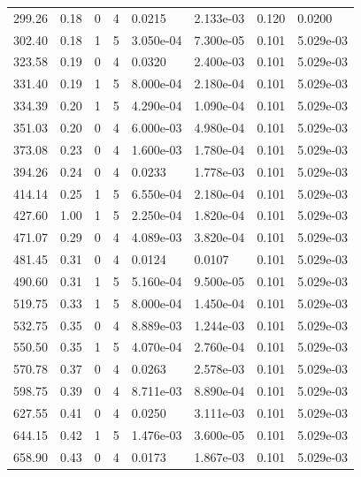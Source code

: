 \documentclass[preview]{standalone}
\begin{document}
{{\begin{tabular}{L{1.2cm}C{1.2cm} C{0.3cm}C{0.5cm} C{1.4cm}C{1.4cm} C{1.4cm}C{1.4cm}}
  299.26  &  0.18  & 0     &  4 &  0.0215  & 2.133e-03  & 0.120 &  0.0200   \\ 
  302.40  &  0.18  & 1     &  5 &  3.050e-04  & 7.300e-05  & 0.101 &  5.029e-03   \\ 
  323.58  &  0.19  & 0     &  4 &  0.0320  & 2.400e-03  & 0.101 &  5.029e-03   \\ 
  331.40  &  0.19  & 1     &  5 &  8.000e-04  & 2.180e-04  & 0.101 &  5.029e-03   \\ 
  334.39  &  0.20  & 1     &  5 &  4.290e-04  & 1.090e-04  & 0.101 &  5.029e-03   \\ 
  351.03  &  0.20  & 0     &  4 &  6.000e-03  & 4.980e-04  & 0.101 &  5.029e-03   \\ 
  373.08  &  0.23  & 0     &  4 &  1.600e-03  & 1.780e-04  & 0.101 &  5.029e-03   \\ 
  394.26  &  0.24  & 0     &  4 &  0.0233  & 1.778e-03  & 0.101 &  5.029e-03   \\ 
  414.14  &  0.25  & 1     &  5 &  6.550e-04  & 2.180e-04  & 0.101 &  5.029e-03   \\ 
  427.60  &  1.00  & 1     &  5 &  2.250e-04  & 1.820e-04  & 0.101 &  5.029e-03   \\ 
  471.07  &  0.29  & 0     &  4 &  4.089e-03  & 3.820e-04  & 0.101 &  5.029e-03   \\ 
  481.45  &  0.31  & 0     &  4 &  0.0124  & 0.0107  & 0.101 &  5.029e-03   \\ 
  490.60  &  0.31  & 1     &  5 &  5.160e-04  & 9.500e-05  & 0.101 &  5.029e-03   \\ 
  519.75  &  0.33  & 1     &  5 &  8.000e-04  & 1.450e-04  & 0.101 &  5.029e-03   \\ 
  532.75  &  0.35  & 0     &  4 &  8.889e-03  & 1.244e-03  & 0.101 &  5.029e-03   \\ 
  550.50  &  0.35  & 1     &  5 &  4.070e-04  & 2.760e-04  & 0.101 &  5.029e-03   \\ 
  570.78  &  0.37  & 0     &  4 &  0.0263  & 2.578e-03  & 0.101 &  5.029e-03   \\ 
  598.75  &  0.39  & 0     &  4 &  8.711e-03  & 8.890e-04  & 0.101 &  5.029e-03   \\ 
  627.55  &  0.41  & 0     &  4 &  0.0250  & 3.111e-03  & 0.101 &  5.029e-03   \\ 
  644.15  &  0.42  & 1     &  5 &  1.476e-03  & 3.600e-05  & 0.101 &  5.029e-03   \\ 
  658.90  &  0.43  & 0     &  4 &  0.0173  & 1.867e-03  & 0.101 &  5.029e-03   \\ 

\end{tabular}}}
\end{document}
